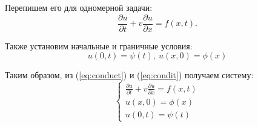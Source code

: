 Перепишем его для одномерной задачи:
\begin{equation}
	\frac{\partial u}{\partial t} + v \frac{\partial u}{\partial x} = f(x,t).
	\label{eq:conduct}
\end{equation}

Также установим начальные и граничные условия:
\begin{equation}
	u(0,t) = \psi(t), \ u(x,0) = \phi(x)
	\label{eq:condit}
\end{equation}

Таким образом, из (\ref{eq:conduct}) и (\ref{eq:condit}) получаем систему:
\begin{equation}
	\begin{cases}
			\frac{\partial u}{\partial t} + v \frac{\partial u}{\partial x} = f(x,t) \\
			u(x,0) = \phi(x) \\
			u(0,t) = \psi(t)
	\end{cases}
	\label{eq:sys}
\end{equation}